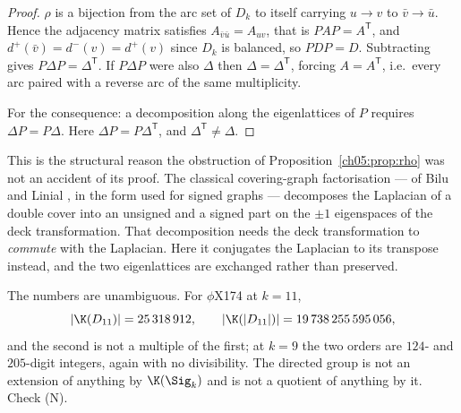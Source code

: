 \begin{proof}
$\rho$ is a bijection from the arc set of $D_k$ to itself carrying $u\to v$ to
$\bar v\to\bar u$. Hence the adjacency matrix satisfies $A_{\bar v\bar u}=A_{uv}$, that is
$PAP=A^{\mathsf T}$, and $d^+(\bar v)=d^-(v)=d^+(v)$ since $D_k$ is balanced, so $PDP=D$.
Subtracting gives $P\Delta P=\Delta^{\mathsf T}$. If $P\Delta P$ were also $\Delta$ then
$\Delta=\Delta^{\mathsf T}$, forcing $A=A^{\mathsf T}$, i.e.\ every arc paired with a reverse
arc of the same multiplicity.

For the consequence: a decomposition along the eigenlattices of $P$ requires
$\Delta P=P\Delta$. Here $\Delta P=P\Delta^{\mathsf T}$, and $\Delta^{\mathsf T}\ne\Delta$.
\end{proof}

This is the structural reason the obstruction of Proposition~\ref{ch05:prop:rho} was not an
accident of its proof. The classical covering-graph factorisation --- of Bilu and Linial \cite{BL06}, in the
form used for signed graphs --- decomposes the Laplacian of a double cover into an unsigned
and a signed part on the $\pm1$ eigenspaces of the deck transformation. That decomposition
needs the deck transformation to \emph{commute} with the Laplacian. Here it conjugates the
Laplacian to its transpose instead, and the two eigenlattices are exchanged rather than
preserved.

The numbers are unambiguous. For $\phi$X174 at $k=11$,
\[
  |\K(D_{11})| = 25\,318\,912 ,\qquad
  |\K(|D_{11}|)| = 19\,738\,255\,595\,056 ,
\]
and the second is not a multiple of the first; at $k=9$ the two orders are $124$- and
$205$-digit integers, again with no divisibility. The directed group is not an extension of
anything by $\K(\Sig_k)$ and is not a quotient of anything by it. Check (N).

